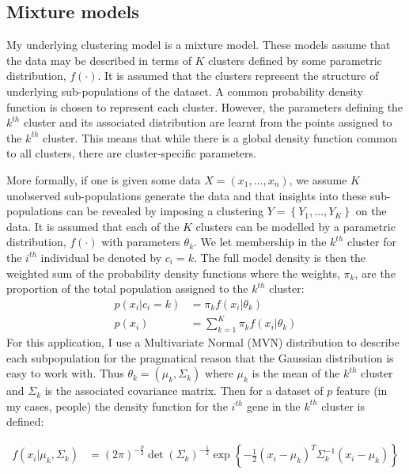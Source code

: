 \documentclass[12pt]{article} %
\begin{document}
	\subsection{Mixture models} \label{sec:theory:sub_sec:mixture_models}
	My underlying clustering model is a mixture model. These models assume that the data may be described in terms of $K$ clusters defined by some parametric distribution, $f(\cdot)$. It is assumed that the clusters represent the structure of underlying sub-populations of the dataset. A common probability density function is chosen to represent each cluster. However, the parameters defining the $k^{th}$ cluster and its associated distribution are learnt from the points assigned to the $k^{th}$ cluster. This means that while there is a global density function common to all clusters, there are cluster-specific parameters.
	
	More formally, if one is given some data $X = (x_1, \ldots, x_n)$, we assume $K$ unobserved sub-populations generate the data and that insights into these sub-populations can be revealed by imposing a clustering $Y = \left\{Y_1,\ldots,Y_K\right\}$ on the data. It is assumed that each of the $K$ clusters can be modelled by a parametric distribution, $f(\cdot)$ with parameters $\theta_k$. We let membership in the $k^{th}$ cluster for the $i^{th}$ individual be denoted by $c_i = k$. The full model density is then the weighted sum of the probability density functions where the weights, $\pi_k$, are the proportion of the total population assigned to the $k^{th}$ cluster:
	\begin{align}
	p(x_i|c_i = k) &= \pi_k f(x_i | \theta_k) \\
	p(x_i) &= \sum_{k=1}^K \pi_k f(x_i | \theta_k) \label{eqn:finite_dirichlet__mixture_model}
	\end{align}
	For this application, I use a Multivariate Normal (MVN) distribution to describe each subpopulation for the pragmatical reason that the Gaussian distribution is easy to work with. Thus $\theta_k = (\mu_k, \Sigma_k)$ where $\mu_k$ is the mean of the $k^{th}$ cluster and $\Sigma_k$ is the associated covariance matrix. Then for a dataset of $p$ feature (in my cases, people) the density function for the $i^{th}$ gene in the $k^{th}$ cluster is defined:
	
	\begin{align}
	f(x_i| \mu_k, \Sigma_k) &= (2 \pi)^{-\frac{p}{2}}\det(\Sigma_k)^{-\frac{1}{2}} \exp\left\{-\frac{1}{2} (x_i - \mu_k)^T \Sigma_k^{-1} (x_i - \mu_k)\right\}
	\end{align}
	
\end{document}
